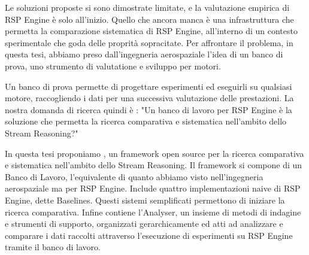 Le soluzioni proposte si sono dimostrate limitate, e la valutazione empirica di RSP Engine \`e  solo all'inizio. Quello che ancora manca \`e  una infrastruttura che permetta la comparazione sistematica di RSP Engine, all'interno di un contesto sperimentale che goda delle proprit\`a sopracitate. Per affrontare il problema, in questa tesi, abbiamo preso dall'ingegneria aerospaziale l'idea di un banco di prova, uno strumento di valutatione e sviluppo per motori.

Un banco di prova permette di progettare esperimenti ed eseguirli su qualsiasi motore, raccogliendo i dati per una successiva valutazione delle prestazioni. 
La nostra domanda di ricerca quindi \`e : "Un banco di lavoro per RSP Engine \`e  la soluzione che permetta la ricerca comparativa e sistematica nell'ambito dello Stream Reasoning?"

In questa tesi proponiamo \namens, un framework open source per la ricerca comparativa e sistematica nell'ambito dello Stream Reasoning. Il framework si compone di un Banco di Lavoro, l'equivalente di quanto abbiamo visto nell'ingegneria aerospaziale ma per RSP Engine. Include quattro implementazioni naive di RSP Engine, dette Baselines. Questi sistemi semplificati permettono di iniziare la ricerca comparativa. Infine \name contiene l'Analyser, un insieme di metodi di indagine e strumenti di supporto, organizzati gerarchicamente ed atti ad analizzare e comparare i dati raccolti attraverso l'esecuzione di esperimenti su RSP Engine tramite il banco di lavoro.
